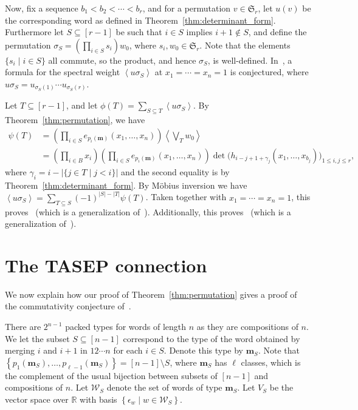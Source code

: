 \documentclass[reqno]{amsart}
\newcommand{\0}{\phantom{c}}
\newcommand{\swt}[1]{\left\langle #1 \right\rangle} %
\newcommand{\SymGp}[1]{\mathfrak{S}_{#1}} %
\newcommand{\mm}{\mathbf{m}}
\newcommand{\mcW}{\mathcal{W}}
\newcommand{\RR}{\mathbb{R}}
\let\sumnonlimits\sum
\let\prodnonlimits\prod
\renewcommand{\sum}{\sumnonlimits\limits}
\renewcommand{\prod}{\prodnonlimits\limits}
\newcommand{\set}[1]{\left\{ #1 \right\}}
\newcommand{\ive}[1]{\left[ #1 \right]}
\theoremstyle{plain}
\theoremstyle{definition}
\numberwithin{equation}{section}
\begin{document}
Now, fix a sequence $b_1 < b_2 < \cdots < b_r$, and for a permutation $v \in \SymGp{r}$, let $u(v)$ be the corresponding word as defined in Theorem~\ref{thm:determinant_form}.
Furthermore let $S \subseteq \ive{r-1}$ be such that $i\in S$ implies $i+1 \notin S$, and define the permutation $\sigma_S = \left( \prod_{i \in S} s_i \right) w_0$, where $s_i, w_0 \in \SymGp{r}$.
Note that the elements $\{s_i \mid i \in S\}$ all commute, so the product, and hence $\sigma_S$, is well-defined.
In~\cite[Conj.~3.10]{AasLin17}, a formula for the spectral weight $\swt{u \sigma_S}$ at $x_1 = \cdots = x_n = 1$ is conjectured, where $u \sigma_S = u_{\sigma_S(1)} \cdots u_{\sigma_S(r)}$.

Let $T \subseteq \ive{r-1}$, and let $\phi(T) = \sum_{S \subseteq T} \swt{u \sigma_S}$.
By Theorem~\ref{thm:permutation}, we have
\begin{align*}
  \psi(T) & = \left(\prod_{i\in S} e_{p_i(\mm)}(x_1, \dotsc, x_n) \right) \swt{ \bigvee_T w_0}
  \\ & = \left( \prod_{i\in B} x_i \right) \left(\prod_{i\in S} e_{p_i(\mm)}(x_1, \dotsc, x_n) \right) \det\bigl(h_{i-j+1+\gamma_j}(x_1, \dotsc, x_{b_j})\bigr)_{1\leq i,j \leq r},
\end{align*}
where $\gamma_i = i - \lvert \{j\in T \mid j < i \} \rvert$ and the second equality is by Theorem~\ref{thm:determinant_form}.
By M\"obius inversion we have $\swt{u \sigma_S} = \sum_{T\subseteq S} (-1)^{|S|-|T|} \psi(T)$.
Taken together with $x_1 = \cdots = x_n = 1$, this proves~\cite[Conj.~3.10]{AasLin17} (which is a generalization of~\cite[Conj.~3.9]{AasLin17}).
Additionally, this proves~\cite[Conj.~3.6]{AasLin17} (which is a generalization of~\cite[Conj.~3.4]{AasLin17}).










\section{The TASEP connection}
\label{sec:tasep}

We now explain how our proof of Theorem~\ref{thm:permutation} gives a proof of the commutativity conjecture of~\cite{AAMP}.

There are $2^{n-1}$ packed types for words of length $n$ as they are compositions of $n$.
We let the subset $S \subseteq [n-1]$ correspond to the type of the word obtained by merging $i$ and $i+1$ in $12 \dotsm n$ for each $i \in S$.
Denote this type by $\mm_S$.
Note that $\set{p_1(\mm_S), \dotsc, p_{\ell-1}(\mm_S)} = [n-1] \setminus S$, where $\mm_S$ has $\ell$ classes, which is the complement of the usual bijection between subsets of $\ive{n-1}$ and compositions of $n$.
Let $\mcW_S$ denote the set of words of type $\mm_S$.
Let $V_S$ be the vector space over $\RR$ with basis $\set{\epsilon_w \mid w \in \mcW_S}$.
\end{document}
